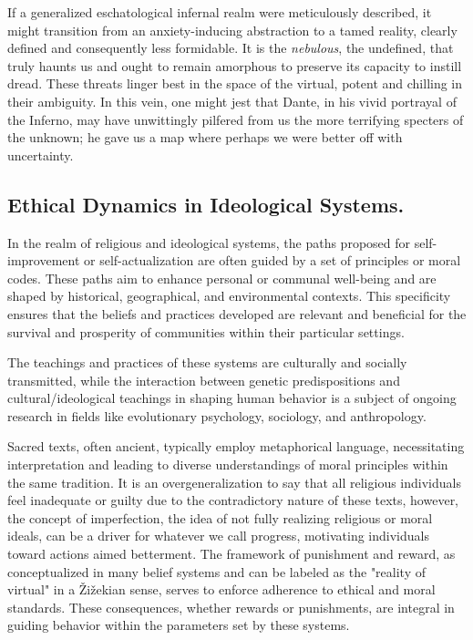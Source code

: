 \documentclass[11pt,a4]{article}
\begin{document}
        \par
        If a generalized eschatological infernal realm were meticulously described, it might transition
        from an anxiety-inducing abstraction to a tamed reality, clearly defined and consequently less
        formidable. It is the \textit{nebulous}, the undefined, that truly haunts us and ought to remain
        amorphous to preserve its capacity to instill dread. These threats linger best in the space of
        the virtual, potent and chilling in their ambiguity. In this vein, one might jest that Dante,
        in his vivid portrayal of the Inferno, may have unwittingly pilfered from us the more terrifying
        specters of the unknown; he gave us a map where perhaps we were better off with uncertainty.

    \subsection{Ethical Dynamics in Ideological Systems.} \label{religion}
        In the realm of religious and ideological systems, the paths proposed for self-improvement or
        self-actualization are often guided by a set of principles or moral codes. These paths aim to
        enhance personal or communal well-being and are shaped by historical, geographical,
        and environmental contexts. This specificity ensures that the beliefs and practices developed
        are relevant and beneficial for the survival and prosperity of communities within their
         particular settings.
        \par
        The teachings and practices of these systems are culturally and socially transmitted, while
        the interaction between genetic predispositions and cultural/ideological teachings in shaping
        human behavior is a subject of ongoing research in fields like evolutionary psychology,
        sociology, and anthropology.
        \par
        Sacred texts, often ancient, typically employ metaphorical language, necessitating
        interpretation and leading to diverse understandings of moral principles within the same tradition.
        It is an overgeneralization to say that all religious individuals feel inadequate or guilty
        due to the contradictory nature of these texts, however, the concept of imperfection,
        the idea of not fully realizing religious or moral ideals, can be a driver for whatever we call progress,
        motivating individuals toward actions aimed betterment.
        The framework of punishment and reward, as conceptualized in many belief systems and can be
        labeled as the "reality of virtual" in a Žižekian sense, serves to enforce adherence to
        ethical and moral standards. These consequences, whether rewards or punishments,
         are integral in guiding behavior within the parameters set by these systems.
\end{document}
